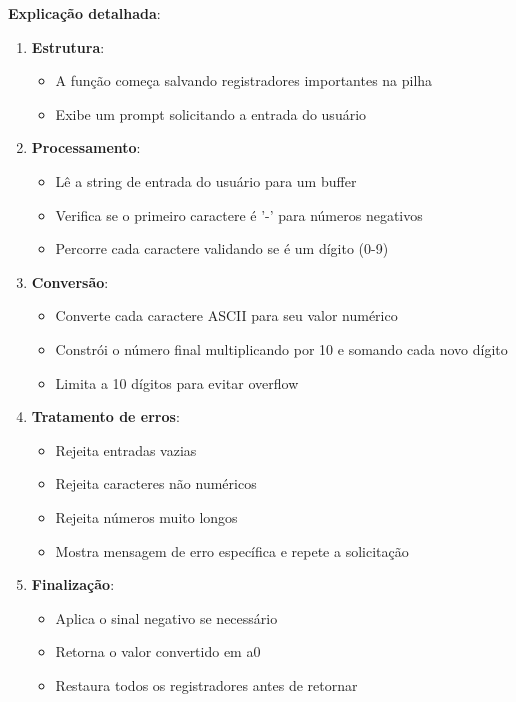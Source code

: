 \documentclass[12pt]{article}
\begin{document}
\textbf{Explicação detalhada}:
\begin{enumerate}
	\item \textbf{Estrutura}:
		\begin{itemize}
			\item A função começa salvando registradores importantes na pilha
			\item Exibe um prompt solicitando a entrada do usuário
		\end{itemize}

	\item \textbf{Processamento}:
		\begin{itemize}
			\item Lê a string de entrada do usuário para um buffer
			\item Verifica se o primeiro caractere é '-' para números negativos
			\item Percorre cada caractere validando se é um dígito (0-9)
		\end{itemize}

	\item \textbf{Conversão}:
		\begin{itemize}
			\item Converte cada caractere ASCII para seu valor numérico
			\item Constrói o número final multiplicando por 10 e somando cada novo dígito
			\item Limita a 10 dígitos para evitar overflow
		\end{itemize}

	\item \textbf{Tratamento de erros}:
		\begin{itemize}
			\item Rejeita entradas vazias
			\item Rejeita caracteres não numéricos
			\item Rejeita números muito longos
			\item Mostra mensagem de erro específica e repete a solicitação
		\end{itemize}

	\item \textbf{Finalização}:
		\begin{itemize}
			\item Aplica o sinal negativo se necessário
			\item Retorna o valor convertido em a0
			\item Restaura todos os registradores antes de retornar
		\end{itemize}
\end{enumerate}
\end{document}
